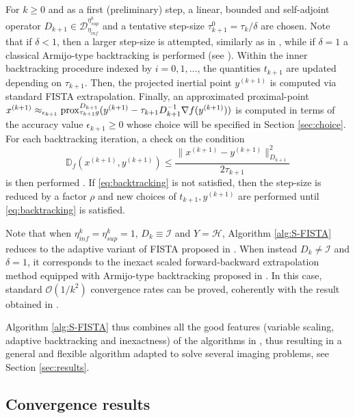 \documentclass[conference]{IEEEtran}
\begin{document}
For $k\geq 0$ and as a first (preliminary) step, a linear, bounded and self-adjoint operator $D_{k+1}\in\mathcal{D}_{\eta_{inf}}^{\eta^k_{sup}}$ and a tentative step-size $\tau_{k+1}^0=\tau_k/\delta$ are chosen. Note that if $\delta<1$, then a larger step-size is attempted, similarly as in \cite{Calatroni-Chambolle-2019,Florea2020,Scheinberg-2014}, while if $\delta=1$ a classical Armijo-type backtracking is performed (see \cite{Beck-Teboulle-2009b}). Within the inner backtracking procedure indexed by $i= 0, 1,\ldots$, the quantities $t_{k+1}$ are updated depending on $\tau_{k+1}$. Then, the projected inertial point $y^{(k+1)}$ is computed via standard FISTA extrapolation. Finally, an approximated proximal-point $x^{(k+1)}\approx_{\epsilon_{k+1}} \mathrm{prox}_{\tau_{k+1} g}^{D_{k+1}}(y^{(k+1)}-\tau_{k+1}D_{k+1}^{-1}\nabla f(y^{(k+1)}))$ is computed in terms of the accuracy value $\epsilon_{k+1}\geq 0$ whose choice will be specified in Section \ref{sec:choice}. For each backtracking iteration, a check on the condition 
\begin{equation}\label{eq:backtracking}
\mathbb{D}_{f}(x^{(k+1)},y^{(k+1)})\leq \frac{\|x^{(k+1)}-y^{(k+1)}\|_{D_{k+1}}^2}{2\tau_{k+1}}
\end{equation}
is then performed . If \eqref{eq:backtracking} is not satisfied, then the step-size is reduced by a factor $\rho$ and new choices of $t_{k+1}, y^{(k+1)}$ are performed until \eqref{eq:backtracking} is satisfied. %

Note that when $\eta_{inf}^k=\eta_{sup}^k=1$, $D_k\equiv \mathcal{I}$ and $Y=\mathcal{H}$, Algorithm \ref{alg:S-FISTA} reduces to the adaptive variant of FISTA proposed in \cite{Scheinberg-2014}. 
When instead $D_k\neq \mathcal{I}$ and $\delta=1$, it corresponds to the inexact scaled forward-backward extrapolation method equipped with Armijo-type backtracking proposed in \cite{Bonettini2018a}. In this case, standard $\mathcal{O}(1/k^2)$ convergence rates can be proved, coherently with the result obtained in \cite[Theorem 3.1]{Bonettini2018a}.

Algorithm \ref{alg:S-FISTA} thus combines all the good features (variable scaling, adaptive backtracking and inexactness) of the algorithms in \cite{Beck-Teboulle-2009b,Scheinberg-2014,Bonettini2018a}, thus resulting in a general and flexible algorithm adapted to solve several imaging problems, see Section \ref{sec:results}.

\subsection{Convergence results}
\end{document}
